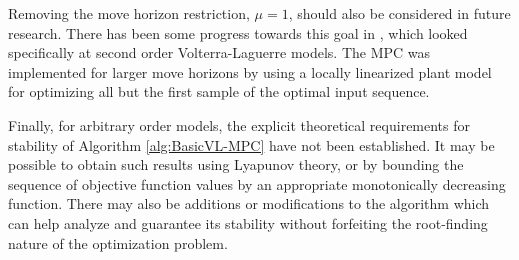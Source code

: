 Removing the move horizon restriction, $\mu=1$, should also be considered in future research. There has been some progress towards this goal in \cite{Parker2002}, which looked specifically at second order Volterra-Laguerre models. The MPC was implemented for larger move horizons by using a locally linearized plant model for optimizing all but the first sample of the optimal input sequence. 

Finally, for arbitrary order models, the explicit theoretical requirements for stability of Algorithm \ref{alg:BasicVL-MPC} have not been established. It may be possible to obtain such results using Lyapunov theory, or by bounding the sequence of objective function values by an appropriate monotonically decreasing function. There may also be additions or modifications to the algorithm which can help analyze and guarantee its stability without forfeiting the root-finding nature of the optimization problem.